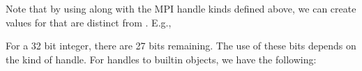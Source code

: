 \documentclass{article}
\begin{document}
Note that by using  along with the MPI handle
kinds defined above, we can create values for  that
are distinct from .  E.g., 
\begin{description}
\item[]       
\item[]      
\item[]   
\item[]       
\item[] 
\item[]         
\item[]       
\item[]        
\item[]  
\end{description}


For a 32 bit integer, there are 27 bits remaining.
The use of these bits depends on the kind of handle.  For handles to
builtin objects, we have the following:
\end{document}
